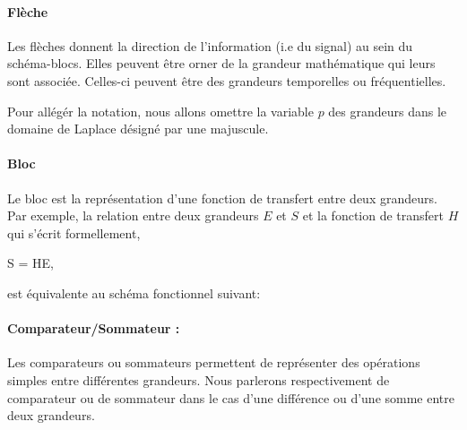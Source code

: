 \paragraph{Flèche}
Les flèches donnent la direction de l'information (i.e du signal) au sein du schéma-blocs. 
Elles peuvent être orner de la grandeur mathématique qui leurs sont associée. 
Celles-ci peuvent être des grandeurs temporelles ou fréquentielles. 
\begin{center}
\end{center}
Pour allégér la notation, nous allons omettre la variable $p$ des grandeurs dans le domaine de Laplace 
désigné par une majuscule.

\paragraph{Bloc}

Le bloc est la représentation d'une fonction de transfert entre deux grandeurs.
Par exemple, la relation entre deux grandeurs $E$ et $S$ et la fonction de transfert $H$
qui s'écrit formellement, 
\begin{bequation}
S = HE,\label{eq-ES}
\end{bequation}

est équivalente au schéma fonctionnel suivant:

\begin{center}
\end{center}


\paragraph{Comparateur/Sommateur :}

Les comparateurs ou sommateurs permettent de représenter des opérations 
simples entre différentes grandeurs.
Nous parlerons respectivement de comparateur ou de sommateur dans le cas 
d'une différence ou d'une somme entre deux grandeurs. 



